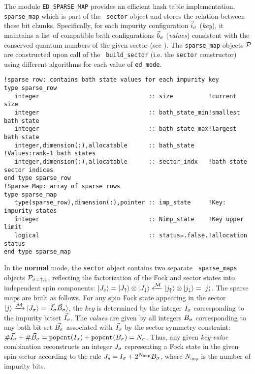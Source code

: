 \documentclass[edipack_sp.tex]{subfiles}
\begin{document}
The module {\tt ED\_SPARSE\_MAP} provides an efficient hash table 
implementation, {\tt sparse\_map} which is part of the {\tt
  sector} object and stores the relation between these bit chunks. 
Specifically, for each impurity configuration 
$\vec{i}_\sigma$ ({\it key}), it maintains a list of compatible bath 
configurations $\vec{b}_\sigma$ ({\it values}) consistent with the conserved 
quantum numbers of the given sector (see ).
The {\tt sparse\_map} objects ${\cal P}$ are constructed upon call of the {\tt
  build\_sector} (i.e. the {\tt sector} constructor) using different algorithms 
for each value of {\tt ed\_mode}.


\begin{lstlisting}[style=fstyle,numbers=none]
!sparse row: contains bath state values for each impurity key 
type sparse_row
   integer                               :: size          !current size
   integer                               :: bath_state_min!smallest bath state
   integer                               :: bath_state_max!largest bath state
   integer,dimension(:),allocatable      :: bath_state    !Values:rank-1 bath states
   integer,dimension(:),allocatable      :: sector_indx   !bath state sector indices
end type sparse_row
!Sparse Map: array of sparse rows 
type sparse_map
   type(sparse_row),dimension(:),pointer :: imp_state     !Key: impurity states
   integer                               :: Nimp_state    !Key upper limit 
   logical                               :: status=.false.!allocation status
end type sparse_map
\end{lstlisting}


In the {\bf normal} mode, the {\tt sector} object contains two separate {\tt
  sparse\_maps} objects ${\cal P}_{\sigma=\uparrow,\downarrow}$, reflecting the
factorization of the Fock and sector states into independent spin components: 
$|J_e\rangle=|J_\uparrow\rangle\otimes|J_\downarrow\rangle \xleftarrow{{\cal M}}
|j_\uparrow\rangle\otimes|j_\downarrow\rangle=|j\rangle$.
The sparse maps are built as follows. 
For any spin Fock state appearing in the sector $|j\rangle\xrightarrow{{\cal M}}|J_\sigma\rangle=|{\vec{I}_{\sigma}\vec{B}_{\sigma}}\rangle$,
the {\it key} is determined by the integer $I_\sigma$ corresponding to the
impurity bitset $\vec{I}_\sigma$. The {\it values} are given by all 
integers $B_\sigma$ corresponding to any bath bit set
$\vec{B_\sigma}$ associated with $\vec{I}_\sigma$ by the sector symmetry constraint: $\#\vec{I}_\sigma + \#\vec{B}_\sigma = \mathtt{popcnt}(I_\sigma) + \mathtt{popcnt}(B_\sigma)= N_\sigma$.
Thus, any given {\it key-value} combination 
reconstructs an integer $J_\sigma$ representing a Fock state in the
given spin sector according to the rule $J_s = I_\sigma +
2^{N_\mathrm{imp}}B_\sigma$, where $N_\mathrm{imp}$ is the number of impurity bits. 
\end{document}
